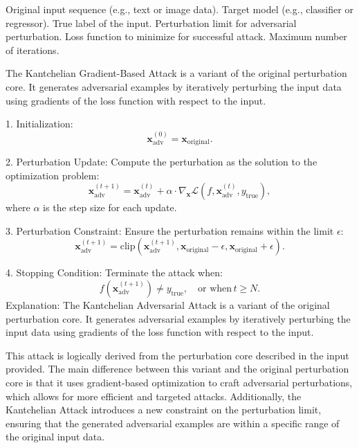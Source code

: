 Original input sequence (e.g., text or image data).
Target model (e.g., classifier or regressor).
True label of the input.
Perturbation limit for adversarial perturbation.
Loss function to minimize for successful attack.
Maximum number of iterations.

The Kantchelian Gradient-Based Attack is a variant of the original perturbation core. It generates adversarial examples by iteratively perturbing the input data using gradients of the loss function with respect to the input.

1. Initialization:
   \[
   \mathbf{x}_{\text{adv}}^{(0)} = \mathbf{x}_{\text{original}}.
   \]

2. Perturbation Update:
   Compute the perturbation as the solution to the optimization problem:
   \[
   \mathbf{x}_{\text{adv}}^{(t+1)} = \mathbf{x}_{\text{adv}}^{(t)} + \alpha \cdot \nabla_{\mathbf{x}} \mathcal{L}(f, \mathbf{x}_{\text{adv}}^{(t)}, y_{\text{true}}),
   \]
   where $\alpha$ is the step size for each update.

3. Perturbation Constraint:
   Ensure the perturbation remains within the limit $\epsilon$:
   \[
   \mathbf{x}_{\text{adv}}^{(t+1)} = \text{clip}(\mathbf{x}_{\text{adv}}^{(t+1)}, \mathbf{x}_{\text{original}} - \epsilon, \mathbf{x}_{\text{original}} + \epsilon).
   \]

4. Stopping Condition:
   Terminate the attack when:
   \[
   f(\mathbf{x}_{\text{adv}}^{(t+1)}) \neq y_{\text{true}}, \quad \text{or when} \, t \geq N.
   \]
Explanation: The Kantchelian Adversarial Attack is a variant of the original perturbation core. It generates adversarial examples by iteratively perturbing the input data using gradients of the loss function with respect to the input.

This attack is logically derived from the perturbation core described in the input provided. The main difference between this variant and the original perturbation core is that it uses gradient-based optimization to craft adversarial perturbations, which allows for more efficient and targeted attacks. Additionally, the Kantchelian Attack introduces a new constraint on the perturbation limit, ensuring that the generated adversarial examples are within a specific range of the original input data.